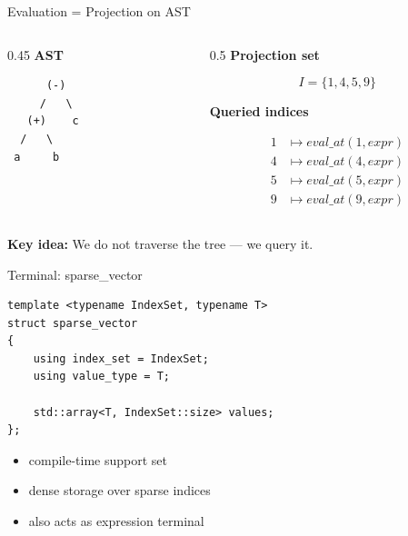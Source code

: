 \documentclass{beamer}
\begin{document}
\begin{frame}[fragile]{Evaluation = Projection on AST}

\begin{columns}[T]
\begin{column}{0.45\textwidth}
\textbf{AST}

\begin{verbatim}
      (-)
     /   \
   (+)    c
  /   \
 a     b
\end{verbatim}
\end{column}

\begin{column}{0.5\textwidth}
\textbf{Projection set}

\[
I = \{1,4,5,9\}
\]

\vspace{0.5em}

\textbf{Queried indices}

\[
\begin{aligned}
1 &\mapsto eval\_at(1, expr) \\
4 &\mapsto eval\_at(4, expr) \\
5 &\mapsto eval\_at(5, expr) \\
9 &\mapsto eval\_at(9, expr)
\end{aligned}
\]
\end{column}
\end{columns}

\vspace{0.8em}

\textbf{Key idea:} We do not traverse the tree --- we query it.

\end{frame}


\begin{frame}[fragile]{Terminal: sparse\_vector}

\begin{lstlisting}
template <typename IndexSet, typename T>
struct sparse_vector
{
    using index_set = IndexSet;
    using value_type = T;

    std::array<T, IndexSet::size> values;
};
\end{lstlisting}

\vspace{1em}

\begin{itemize}
\item compile-time support set
\item dense storage over sparse indices
\item also acts as expression terminal
\end{itemize}

\end{frame}
\end{document}
